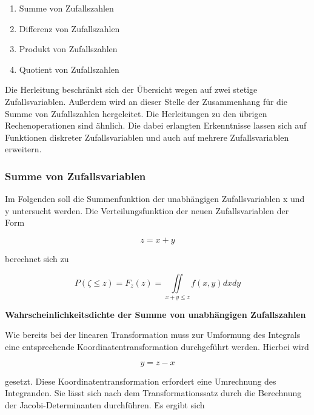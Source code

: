\begin{enumerate}
    \item Summe von Zufallszahlen
    \item Differenz von Zufallszahlen
    \item Produkt von Zufallszahlen
    \item Quotient von Zufallszahlen
\end{enumerate}

\noindent Die Herleitung beschr\"{a}nkt sich der \"{U}bersicht wegen auf zwei stetige Zufallsvariablen. Au{\ss}erdem wird an dieser Stelle der Zusammenhang f\"{u}r die Summe von Zufallszahlen hergeleitet. Die Herleitungen zu den \"{u}brigen Rechenoperationen sind \"{a}hnlich. Die dabei erlangten Erkenntnisse lassen sich auf Funktionen diskreter Zufallsvariablen und auch auf mehrere Zufallsvariablen erweitern. 

\subsubsection{Summe von Zufallsvariablen}

\noindent Im Folgenden soll die Summenfunktion der unabh\"{a}ngigen Zufallsvariablen x und y untersucht werden. Die Verteilungsfunktion der neuen Zufallsvariablen der Form

\begin{equation}\label{eq:eightfourtyfive}
z=x+y
\end{equation}

\noindent berechnet sich zu

\begin{equation}\label{eq:eightfourtysix}
P(\zeta \le z)=F_{z} (z)= \iint\limits_{x+y\le z}f(x,y) dxdy
\end{equation}

{\selectfont
\noindent\textbf{Wahrscheinlichkeitsdichte der Summe von unabh\"{a}ngigen Zufallszahlen}}\smallskip

\noindent Wie bereits bei der linearen Transformation muss zur Umformung des Integrals eine entsprechende Koordinatentransformation durchgef\"{u}hrt werden. Hierbei wird

\begin{equation}\label{eq:eightfourtyseven}
y=z-x
\end{equation}

\noindent gesetzt. Diese Koordinatentransformation erfordert eine Umrechnung des Integranden. Sie l\"{a}sst sich nach dem Transformationssatz durch die Berechnung der Jacobi-Determinanten durchf\"{u}hren. Es ergibt sich 

